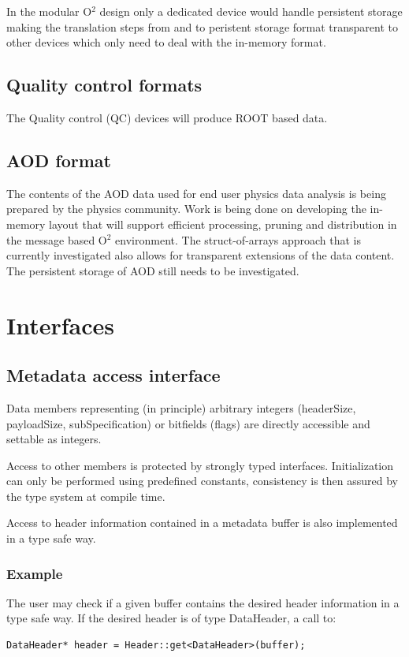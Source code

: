 \documentclass[a4paper,twoside]{article}
\def\O2{O$^2$}
\begin{document}
In the modular \O2 design only a dedicated device would handle persistent storage making the translation steps from and to peristent storage format transparent to other devices which only need to deal with the in-memory format.

\subsection{Quality control formats}
The Quality control (QC) devices will produce ROOT based data.

\subsection{AOD format}
The contents of the AOD data used for end user physics data analysis is being prepared by the physics community. Work is being done on developing the in-memory layout that will support efficient processing, pruning and distribution in the message based \O2 environment. The struct-of-arrays approach that is currently investigated also allows for transparent extensions of the data content. The persistent storage of AOD still needs to be investigated.

\section{Interfaces}

\subsection{Metadata access interface}
Data members representing (in principle) arbitrary integers (headerSize, payloadSize, subSpecification) or bitfields (flags) are directly accessible and settable as integers.

Access to other members is protected by strongly typed interfaces. Initialization can only be performed using predefined constants, consistency is then assured by the type system at compile time.

Access to header information contained in a metadata buffer is also implemented in a type safe way.

\subsubsection{Example}
The user may check if a given buffer contains the desired header information in a type safe way. If the desired header is of type DataHeader, a call to:
\begin{lstlisting}
DataHeader* header = Header::get<DataHeader>(buffer);
\end{lstlisting}
\end{document}
